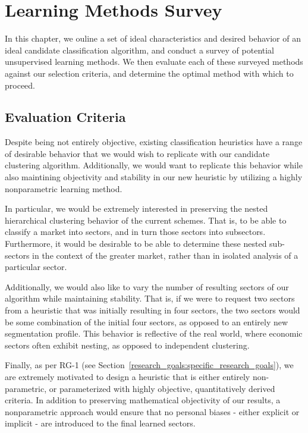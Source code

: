 \documentclass[../main.tex]{subfiles}
\begin{document}
    
\chapter{Learning Methods Survey} \label{learning_methods_survey}


In this chapter, we ouline a set of ideal characteristics and desired behavior of an ideal candidate classification algorithm, and conduct a survey of potential unsupervised learning methods. We then evaluate each of these surveyed methods against our selection criteria, and determine the optimal method with which to proceed.

\section{Evaluation Criteria}

Despite being not entirely objective, existing classification heuristics have a range of desirable behavior that we would wish to replicate with our candidate clustering algorithm. Additionally, we would want to replicate this behavior while also maintining objectivity and stability in our new heuristic by utilizing a highly nonparametric learning method.

In particular, we would be extremely interested in preserving the nested hierarchical clustering behavior of the current schemes. That is, to be able to classify a market into sectors, and in turn those sectors into subsectors. Furthermore, it would be desirable to be able to determine these nested sub-sectors in the context of the greater market, rather than in isolated analysis of a particular sector.

Additionally, we would also like to vary the number of resulting sectors of our algorithm while maintaining stability. That is, if we were to request two sectors from a heuristic that was initially resulting in four sectors, the two sectors would be some combination of the initial four sectors, as opposed to an entirely new segmentation profile. This behavior is reflective of the real world, where economic sectors often exhibit nesting, as opposed to independent clustering.

Finally, as per RG-1 (see Section~\ref{research_goals:specific_research_goals}), we are extremely motivated to design a heuristic that is either entirely non-parametric, or parameterized with highly objective, quantitatively derived criteria. In addition to preserving mathematical objectivity of our results, a nonparametric approach would ensure that no personal biases - either explicit or implicit - are introduced to the final learned sectors.
\end{document}
